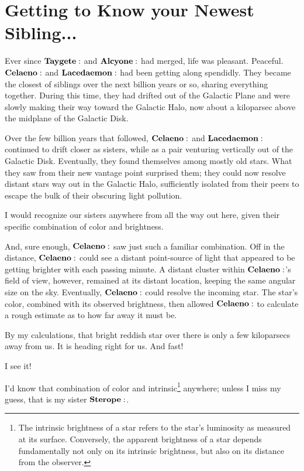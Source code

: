 \documentclass[main.tex]{subfiles}
\begin{document}
\section{Getting to Know your Newest Sibling...}

Ever since $\Taygete$ and $\Alcyone$ had merged, life was pleasant.  Peaceful.  $\Celaeno$ and $\Lacedaemon$ had been getting along spendidly.  They became the closest of siblings over the next billion years or so, sharing everything together.  During this time, they had drifted out of the Galactic Plane and were slowly making their way toward the Galactic Halo, now about a kiloparsec above the midplane of the Galactic Disk. 

Over the few billion years that followed, $\Celaeno$ and $\Lacedaemon$ continued to drift closer as sisters, while as a pair venturing vertically out of the Galactic Disk.  Eventually, they found themselves among mostly old stars. What they saw from their new vantage point surprised them; they could now resolve distant stars way out in the Galactic Halo, sufficiently isolated from their peers to escape the bulk of their obscuring light pollution.  

\Celaeno I would recognize our sisters anywhere from all the way out here, given their specific combination of color and brightness.  

And, sure enough, $\Celaeno$ saw just such a familiar combination.  Off in the distance, $\Celaeno$ could see a distant point-source of light that appeared to be getting brighter with each passing minute.  A distant cluster within $\Celaeno$'s field of view, however, remained at its distant location, keeping the same angular size on the sky.  Eventually, $\Celaeno$ could resolve the incoming star.  The star's color, combined with its observed brightness, then allowed $\Celaeno$ to calculate a rough estimate as to how far away it must be.

\Celaeno  By my calculations, that bright reddish star over there is only a few kiloparsecs away from us.  It is heading right for us.  And fast!  

\Lacedaemon I see it!

\Celaeno I'd know that combination of color and intrinsic\footnote{The intrinsic brightness of a star refers to the star's luminosity as measured at its surface.  Conversely, the apparent brightness of a star depends fundamentally not only on its intrinsic brightness, but also on its distance from the observer.} anywhere; unless I miss my guess, that is my sister $\Sterope$.  
\end{document}
